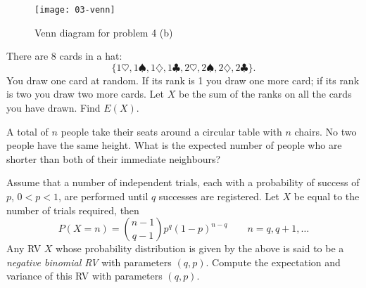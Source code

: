 \documentclass[a4paper,10pt,landscape,twocolumn]{scrartcl}
\begin{document}
\begin{figure}\centering
  \texttt{[image: 03-venn]}	
  \caption{Venn diagram for problem 4 (b)\label{fig:venn}}
\end{figure}

\begin{exercise}
  There are $8$ cards in a hat:
  \[
    \{ 1\heartsuit, 1\spadesuit, 1\diamondsuit, 1\clubsuit, 2\heartsuit,
    2\spadesuit, 2\diamondsuit, 2\clubsuit\}.
  \]
  You draw one card at random. If its rank is 1 you draw one more card;
  if its rank is two you draw two more cards. Let $X$ be the sum of the
  ranks on all the cards you have drawn. Find $E(X)$.	
\end{exercise}


\begin{exercise}
  A total of $n$ people take their seats around a circular table with $n$
  chairs. No two people have the same height. What is the expected number of
  people who are shorter than both of their immediate neighbours?
\end{exercise}


\begin{exercise}
  Assume that a number of independent trials, each with a probability of
  success of $p$, $0 < p < 1$, are performed until $q$ successes are
  registered. Let $X$ be equal to the number of trials required, then
  \[
    P(X = n) 
      = {{n-1} \choose {q-1}} p^{q} (1 - p)^{n-q} 
      \qquad n = q, q+1, \dots
  \]
  Any RV $X$ whose probability distribution is given by the above is said to be
  a \emph{negative binomial RV} with parameters $(q,p)$. Compute the
  expectation and variance of this RV with parameters $(q,p)$.
\end{exercise}

\vfill\creditspracticequestions
\end{document}
